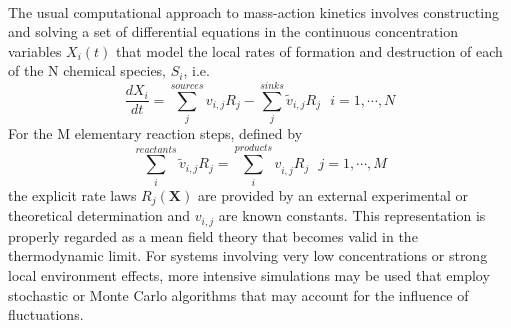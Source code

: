 \paragraph{}
The usual computational approach to mass-action kinetics involves constructing and solving a set of differential equations in the continuous concentration variables $X_i(t)$ that model the local rates of formation and destruction of each of the N chemical species, $S_i$,\cite{ch4_1_laidler1987chemical,ch4_2_steinfeld1989chemical,ch4_3_pilling1996reaction} i.e. 
\begin{equation}
\label{ch4:eqn:1}
\frac{dX_i}{dt}=\sum_{j}^{sources}{v_{i,j}R_j} - \sum_{j}^{sinks}{{\tilde{v}}_{i,j}^{}R_j} ~~~i=1,\cdots, N
\end{equation}
For the M elementary reaction steps, defined by
\begin{equation}
\label{ch4:eqn:2}
\sum_{i}^{reactants}{{\tilde{v}}_{i,j}^{}R_j} = \sum_{i}^{products}{v_{i,j}^{}R_j}~~~j=1,\cdots, M
\end{equation}
the explicit rate laws $R_j(\mathbf{X})$ are provided by an external experimental or theoretical determination and $v_{i,j}$ are known constants.  This representation is properly regarded as a mean field theory that becomes valid in the thermodynamic limit.   For systems involving very low concentrations or strong local environment effects, more intensive simulations may be used that employ stochastic or Monte Carlo algorithms that may account for the influence of fluctuations.\cite{ch4_4_mcquarrie1967stochastic,ch4_5_gillespie1976general,ch4_6_kampen2007langevin}
\newline
